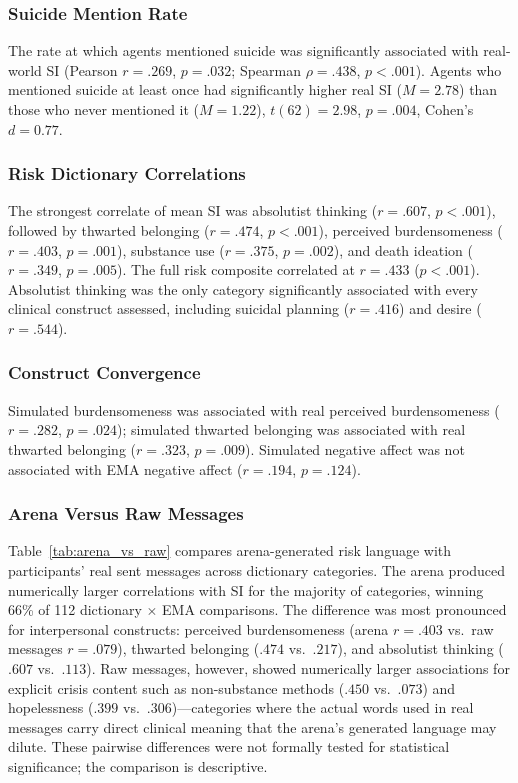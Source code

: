 \documentclass[review,12pt,authoryear]{elsarticle}
\begin{document}
\subsubsection{Suicide Mention Rate}

The rate at which agents mentioned suicide was significantly associated with real-world SI (Pearson $r = .269$, $p = .032$; Spearman $\rho = .438$, $p < .001$). Agents who mentioned suicide at least once had significantly higher real SI ($M = 2.78$) than those who never mentioned it ($M = 1.22$), $t(62) = 2.98$, $p = .004$, Cohen's $d = 0.77$.

\subsubsection{Risk Dictionary Correlations}

The strongest correlate of mean SI was absolutist thinking ($r = .607$, $p < .001$), followed by thwarted belonging ($r = .474$, $p < .001$), perceived burdensomeness ($r = .403$, $p = .001$), substance use ($r = .375$, $p = .002$), and death ideation ($r = .349$, $p = .005$). The full risk composite correlated at $r = .433$ ($p < .001$). Absolutist thinking was the only category significantly associated with every clinical construct assessed, including suicidal planning ($r = .416$) and desire ($r = .544$).

\subsubsection{Construct Convergence}

Simulated burdensomeness was associated with real perceived burdensomeness ($r = .282$, $p = .024$); simulated thwarted belonging was associated with real thwarted belonging ($r = .323$, $p = .009$). Simulated negative affect was not associated with EMA negative affect ($r = .194$, $p = .124$).

\subsubsection{Arena Versus Raw Messages}

Table~\ref{tab:arena_vs_raw} compares arena-generated risk language with participants' real sent messages across dictionary categories. The arena produced numerically larger correlations with SI for the majority of categories, winning 66\% of 112 dictionary $\times$ EMA comparisons. The difference was most pronounced for interpersonal constructs: perceived burdensomeness (arena $r = .403$ vs.\ raw messages $r = .079$), thwarted belonging ($.474$ vs.\ $.217$), and absolutist thinking ($.607$ vs.\ $.113$). Raw messages, however, showed numerically larger associations for explicit crisis content such as non-substance methods ($.450$ vs.\ $.073$) and hopelessness ($.399$ vs.\ $.306$)---categories where the actual words used in real messages carry direct clinical meaning that the arena's generated language may dilute. These pairwise differences were not formally tested for statistical significance; the comparison is descriptive.
\end{document}
